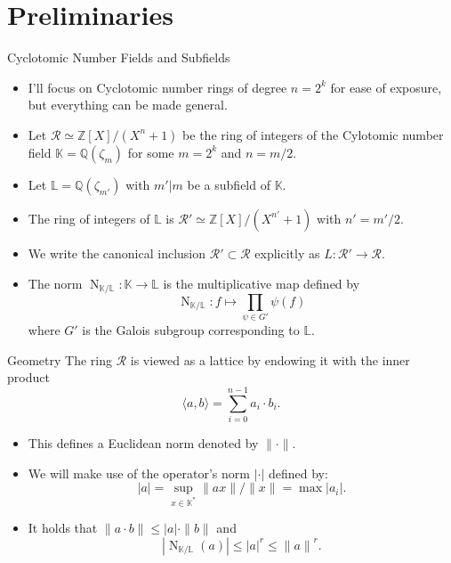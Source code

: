 \documentclass[presentation,smaller]{beamer}
\newcommand{\cR}{\ensuremath{\mathcal{R}}\xspace}
\newcommand{\Z}{\ensuremath{\mathbb Z}\xspace}
\newcommand{\K}{\ensuremath{\mathbb K}\xspace}
\renewcommand{\L}{\ensuremath{\mathbb L}\xspace}
\newcommand{\Q}{\ensuremath{\mathbb Q}\xspace}
\DeclareMathOperator{\Norm}{N}
\begin{document}
\section{Preliminaries}
\label{sec:org52288f7}

\begin{frame}[label={sec:org045e7ab}]{Cyclotomic Number Fields and Subfields}
\begin{itemize}
\item I’ll focus on Cyclotomic number rings of degree \(n = 2^k\) for ease of exposure, but everything can be made general.

\item Let \(\cR ≃ \Z[X]/(X^{n}+1)\) be the ring of integers of the Cylotomic number field \(\K = \Q(ζ_m)\) for some \(m=2^k\) and \(n = m/2\).

\item Let \(\L = \Q(ζ_{m'})\) with \(m' | m\) be a subfield of \(\K\).

\item The ring of integers of \(\L\) is \(\cR' ≃ \Z[X]/(X^{n'} + 1)\) with \(n' = m'/2\).

\item We write the canonical inclusion \(\cR' \subset \cR\) explicitly as \(L : \cR' \rightarrow \cR\).

\item The norm \(\Norm_{\K/\L}: \K \rightarrow \L\) is the multiplicative map defined by \[\Norm_{\K/\L} : f \mapsto  \prod_{\psi \in G'} \psi(f)\] where \(G'\) is the Galois subgroup corresponding to \(\L\).
\end{itemize}
\end{frame}

\begin{frame}[label={sec:org320437c}]{Geometry}
The ring \(\cR\) is viewed as a lattice by endowing it with the inner product \[\langle a , b\rangle = \sum_{i=0}^{n-1} a_i ⋅ b_i.\] 

\begin{itemize}
\item This defines a Euclidean norm denoted by \(\| \cdot \|\).

\item We will make use of the operator's norm \(|\cdot|\) defined by: \[|a| = \sup_{x \in \K^*} \|ax\|/\|x\| = \max |a_i|.\]

\item It holds that \(\| a⋅b \| ≤ |a| ⋅ \| b \|\) and \[|\Norm_{\K/\L}(a)| ≤ {|a|}^r ≤ {\|a\|}^r.\]
\end{itemize}
\end{frame}
\end{document}
